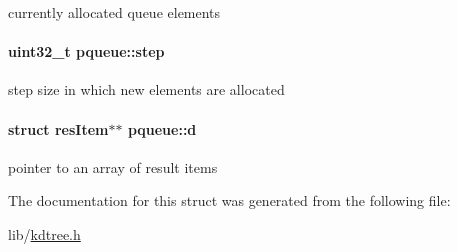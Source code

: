 currently allocated queue elements \hypertarget{structpqueue_9b4b17052da1f1d4a033b47dadf6131c}{
\paragraph[step]{\setlength{\rightskip}{0pt plus 5cm}uint32\_\-t {\bf pqueue::step}}\hfill}
\label{structpqueue_9b4b17052da1f1d4a033b47dadf6131c}


step size in which new elements are allocated \hypertarget{structpqueue_357464d75571c70914c19cac81f6187f}{
\paragraph[d]{\setlength{\rightskip}{0pt plus 5cm}struct {\bf resItem}$\ast$$\ast$ {\bf pqueue::d}}\hfill}
\label{structpqueue_357464d75571c70914c19cac81f6187f}


pointer to an array of result items 

The documentation for this struct was generated from the following file:\begin{CompactItemize}
\item 
lib/\hyperlink{kdtree_8h}{kdtree.h}\end{CompactItemize}
